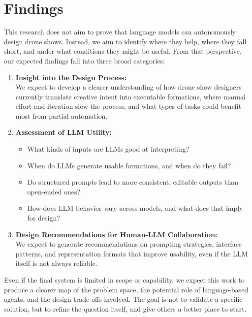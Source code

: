 
\section{Findings}
This research does not aim to prove that language models can autonomously design drone shows. Instead, we aim to identify where they help, where they fall short, and under what conditions they might be useful. From that perspective, our expected findings fall into three broad categories:

\begin{enumerate}
  \item \textbf{Insight into the Design Process:} \\
  We expect to develop a clearer understanding of how drone show designers currently translate creative intent into executable formations, where manual effort and iteration slow the process, and what types of tasks could benefit most from partial automation.

  \item \textbf{Assessment of LLM Utility:}
  \begin{itemize}
    \item What kinds of inputs are LLMs good at interpreting?
    \item When do LLMs generate usable formations, and when do they fail?
    \item Do structured prompts lead to more consistent, editable outputs than open-ended ones?
    \item How does LLM behavior vary across models, and what does that imply for design?
  \end{itemize}

  \item \textbf{Design Recommendations for Human-LLM Collaboration:} \\
  We expect to generate recommendations on prompting strategies, interface patterns, and representation formats that improve usability, even if the LLM itself is not always reliable.
\end{enumerate}
Even if the final system is limited in scope or capability, we expect this work to produce a clearer map of the problem space, the potential role of language-based agents, and the design trade-offs involved. The goal is not to validate a specific solution, but to refine the question itself, and give others a better place to start.
